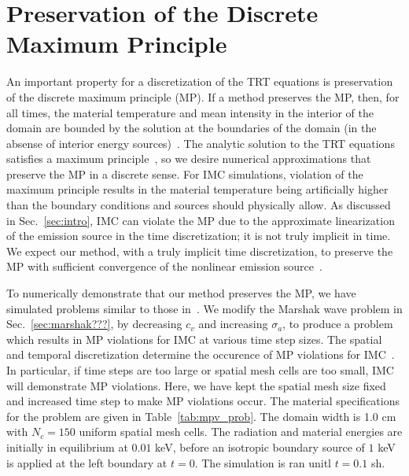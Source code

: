 
\section{Preservation of the Discrete Maximum Principle}

An important property for a discretization of the TRT equations is preservation of the
discrete maximum principle (MP).  If a method preserves the MP, then, for all times, the
material temperature and mean intensity in the interior of the domain are bounded by the solution at the boundaries of
the domain (in the absense of interior energy sources)~\cite{wollaber2013discrete,larsen_mpv}.  
The analytic solution to the TRT equations satisfies a maximum
principle~\cite{larsen_mpv}, so we desire numerical approximations that preserve the MP in
a discrete sense.
For IMC simulations, violation of the maximum principle results in the
material temperature being artificially higher than the boundary conditions and sources
should physically allow.    As discussed in Sec.~\ref{sec:intro}, IMC can violate the MP due to the
approximate linearization of the emission source in the time discretization; it is not
truly implicit in time.  We expect our method, with a truly implicit time discretization,
to preserve the MP with sufficient convergence of the nonlinear emission
source~\cite{larsen_mpv}.

To numerically demonstrate that our method preserves the MP, we have simulated problems
similar to those in~\cite{wollaber2013discrete}.  We modify the Marshak wave problem in
Sec.~\ref{sec:marshak???}, by decreasing $c_v$ and increasing $\sigma_a$, to produce a
problem which results in MP violations for IMC at various time step sizes. 
The spatial and temporal discretization determine the occurence of MP violations for
IMC~\cite{wollaber2013discrete}. In particular, if time steps are too large or spatial
mesh cells are too small, IMC will demonstrate MP violations.  Here, we have kept the
spatial mesh size fixed and increased time step to make MP violations occur.
The material
specifications for the problem are given in Table~\ref{tab:mpv_prob}. The domain width is 1.0 cm with
$N_c=150$ uniform spatial mesh cells.  The radiation and material energies are initially in
equilibrium at $0.01$ keV, before an isotropic boundary source of $1$ keV is applied at
the left boundary at $t=0$. The simulation is ran unitl $t=0.1$ sh. 

